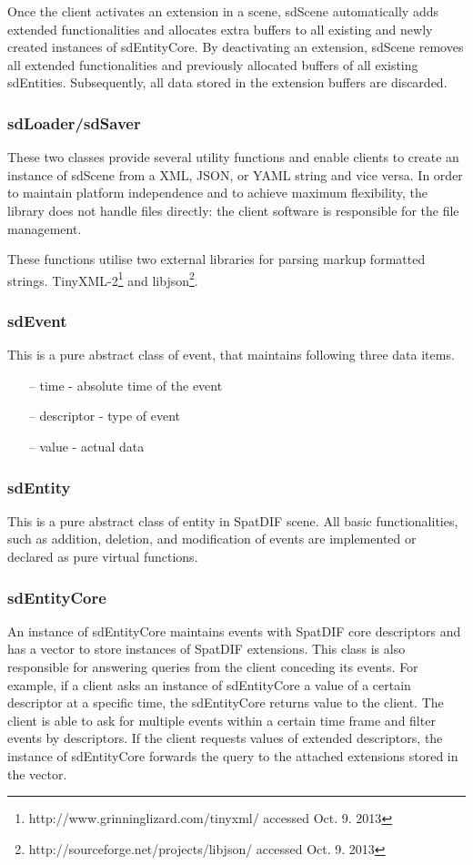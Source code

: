 \documentclass[a4paper]{article}
\begin{document}
Once the client activates an extension in a scene, sdScene automatically adds extended functionalities and allocates extra buffers to all existing and newly created instances of sdEntityCore. 
By deactivating an extension, sdScene removes all extended functionalities and previously allocated buffers of all existing sdEntities. 
Subsequently, all data stored in the extension buffers are discarded.

\subsubsection{sdLoader/sdSaver}
These two classes provide several utility functions and enable clients to create an instance of sdScene from a XML, JSON, or YAML string and vice versa. 
In order to maintain platform independence and to achieve maximum flexibility, the library does not handle files directly: the client software is responsible for the file management. 

These functions utilise two external libraries for parsing markup formatted strings. TinyXML-2\footnote{http://www.grinninglizard.com/tinyxml/ accessed Oct. 9. 2013} and libjson\footnote{http://sourceforge.net/projects/libjson/ accessed Oct. 9. 2013}.

\subsubsection{sdEvent}
This is a pure abstract class of event, that maintains following three data items.

\begin{itemize}[leftmargin=*]
\item[--] time - absolute time of the event
\item[--] descriptor - type of event
\item[--] value - actual data
\end{itemize}

\subsubsection{sdEntity}
This is a pure abstract class of entity in SpatDIF scene. All basic functionalities, such as addition, deletion, and modification of events are implemented or declared as pure virtual functions.

\subsubsection{sdEntityCore}
An instance of sdEntityCore maintains events with SpatDIF core descriptors and has a vector to store instances of SpatDIF extensions. 
This class is also responsible for answering queries from the client conceding its events. For example, if a client asks an instance of sdEntityCore a value of a certain descriptor at a specific time, the sdEntityCore returns value to the client. 
The client is able to ask for multiple events within a certain time frame and filter events by descriptors. If the client requests values of extended descriptors, the instance of sdEntityCore forwards the query to the attached extensions stored in the vector.
\end{document}
